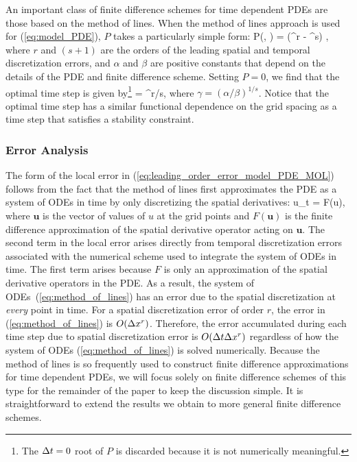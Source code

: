 \documentclass[oneeqnum,onefignum,onetabnum,onethmnum]{siamltex}
\begin{document}
An important class of finite difference schemes for time dependent PDEs are 
those based on the method of lines.   When the method of lines approach is 
used for (\ref{eq:model_PDE}), $P$ takes a particularly simple 
form:
\beq
  P(\dx, \dt) = (\alpha \dx^r - \beta \dt^s) \dt,
  \label{eq:leading_order_error_model_PDE_MOL}
\eeq
where $r$ and $(s+1)$ are the orders of the leading spatial and temporal 
discretization errors, and $\alpha$ and $\beta$ are positive constants that 
depend on the details of the PDE and finite difference scheme.  Setting 
$P = 0$, we find that the optimal time step is given by\footnote{The $\Delta t = 0$ 
root of $P$ is discarded because it is not numerically meaningful.}
\beq
  \dto = \gamma \dx^{r/s},
  \label{eq:optimal_time_step}
\eeq
where $\gamma = (\alpha/\beta)^{1/s}$.  Notice that the optimal time step 
has a similar functional dependence on the grid spacing as a time step that 
satisfies a stability constraint.  


\subsubsection*{\label{sec:error_analysis} 
            Error Analysis}
The form of the local error in 
(\ref{eq:leading_order_error_model_PDE_MOL}) follows from the fact 
that the method of lines first approximates the PDE as a system of ODEs in 
time by only discretizing the spatial derivatives: 
\beq
{\mathbf u}_t = F({\mathbf u}),
\label{eq:method_of_lines}
\eeq
where ${\mathbf u}$ is the vector of values of $u$ at the grid points and
$F({\mathbf u})$ is the finite difference approximation of the spatial 
derivative operator acting on ${\mathbf u}$.  The second term in the local 
error arises directly from temporal discretization errors associated with the 
numerical scheme used to integrate the system of ODEs in time.  The first 
term arises because $F$ is only an approximation of the spatial derivative 
operators in the PDE.  As a result, the system of 
ODEs~(\ref{eq:method_of_lines}) has an error due to the spatial discretization 
at \emph{every} point in time.  For a spatial discretization error of order 
$r$, the error in (\ref{eq:method_of_lines}) is $O(\Delta x^r)$.  Therefore, the 
error accumulated during each time step due to spatial discretization error is 
$O(\Delta t \Delta x^r)$ regardless of how the system of ODEs (\ref{eq:method_of_lines})
is solved numerically.  Because the method of lines is so frequently used to 
construct finite difference approximations for time dependent PDEs, we will 
focus solely on finite difference schemes of this type for the remainder of 
the paper to keep the discussion simple.  It is straightforward to extend the 
results we obtain to more general finite difference schemes. 
\end{document}
